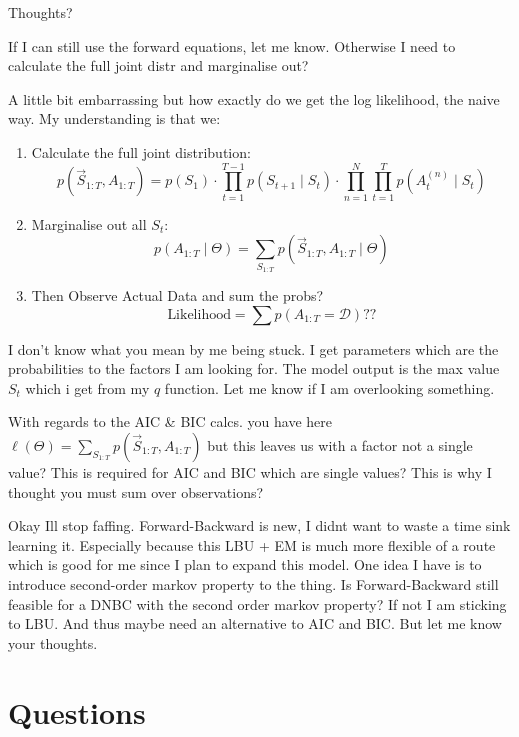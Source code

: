 Thoughts?






If I can still use the forward equations, let me know. Otherwise I need to calculate the full joint distr and marginalise out?


A little bit embarrassing but how exactly do we get the log likelihood, the naive way. My understanding is that we:
\begin{enumerate}
    \item Calculate the full joint distribution: 
    \[
p(\vec{S}_{1:T}, A_{1:T}) = p(S_1) \cdot \prod\limits_{t=1}^{T-1} p(S_{t+1} \mid S_t) \cdot \prod\limits_{n=1}^{N} \prod\limits_{t=1}^T p(A^{(n)}_t \mid S_t)
    \]
    \item Marginalise out all $S_t$: 
        \[
p(A_{1:T} \mid \Theta) = \sum_{S_{1:T}} p(\vec{S}_{1:T}, A_{1:T} \mid \Theta)
        \]
    \item Then Observe Actual Data and sum the probs?
        \[
            \text{Likelihood} = \sum p(A_{1:T} = \mathcal{D}) ??
        \]
\end{enumerate}


I don't know what you mean by me being stuck. I get parameters which are the probabilities to the factors I am looking for. The model output is the max value $S_t$ which i get from my $q$ function. Let me know if I am overlooking something.


With regards to the AIC \& BIC calcs. you have here $\ell(\Theta) = \sum_{S_{1:T}} p(\vec{S}_{1:T}, A_{1:T})$ but this leaves us with a factor not a single value? This is required for AIC and BIC which are single values? This is why I thought you must sum over observations?




Okay Ill stop faffing. Forward-Backward is new, I didnt want to waste a time sink learning it. Especially because this LBU + EM is much more flexible of a route which is good for me since I plan to expand this model. One idea I have is to introduce second-order markov property to the thing. Is Forward-Backward still feasible for a DNBC with the second order markov property? If not I am sticking to LBU. And thus maybe need an alternative to AIC and BIC. But let me know your thoughts.


\newpage

\section{Questions}

